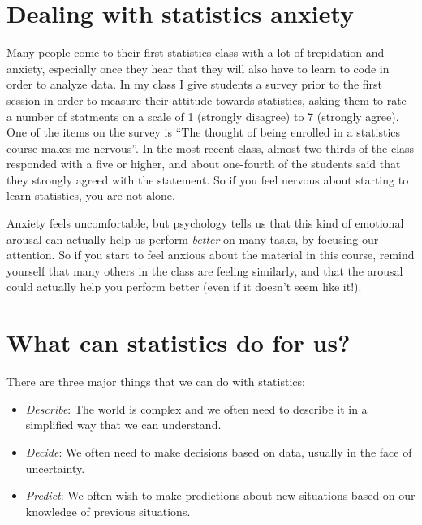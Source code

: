 \documentclass[12pt,]{book}
\providecommand{\tightlist}{%
  \setlength{\itemsep}{0pt}\setlength{\parskip}{0pt}}
\theoremstyle{definition}
\theoremstyle{definition}
\theoremstyle{definition}
\theoremstyle{remark}
\begin{document}
\hypertarget{dealing-with-statistics-anxiety}{%
\section{Dealing with statistics anxiety}\label{dealing-with-statistics-anxiety}}

Many people come to their first statistics class with a lot of trepidation and anxiety, especially once they hear that they will also have to learn to code in order to analyze data. In my class I give students a survey prior to the first session in order to measure their attitude towards statistics, asking them to rate a number of statments on a scale of 1 (strongly disagree) to 7 (strongly agree). One of the items on the survey is ``The thought of being enrolled in a statistics course makes me nervous''. In the most recent class, almost two-thirds of the class responded with a five or higher, and about one-fourth of the students said that they strongly agreed with the statement. So if you feel nervous about starting to learn statistics, you are not alone.

Anxiety feels uncomfortable, but psychology tells us that this kind of emotional arousal can actually help us perform \emph{better} on many tasks, by focusing our attention. So if you start to feel anxious about the material in this course, remind yourself that many others in the class are feeling similarly, and that the arousal could actually help you perform better (even if it doesn't seem like it!).

\hypertarget{what-can-statistics-do-for-us}{%
\section{What can statistics do for us?}\label{what-can-statistics-do-for-us}}

There are three major things that we can do with statistics:

\begin{itemize}
\tightlist
\item
  \emph{Describe}: The world is complex and we often need to describe it in a simplified way that we can understand.\\
\item
  \emph{Decide}: We often need to make decisions based on data, usually in the face of uncertainty.
\item
  \emph{Predict}: We often wish to make predictions about new situations based on our knowledge of previous situations.
\end{itemize}
\end{document}
